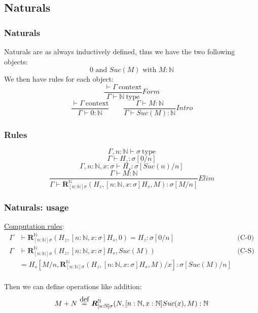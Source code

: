 \documentclass[aspectratio=169]{beamer}
\newcommand{\cntxt}{\ \mathrm{context}}
\newcommand{\typ}{\ \mathrm{type}}
\newcommand{\N}{\mathbb{N}}
\newcommand{\RN}[3]{\mathbold{R}_{[n: \N]\sigma}^{\N}(#1, #2, #3)}
\newcommand{\Intro}{Intro}
\newcommand{\F}{Form}
\newcommand{\E}{Elim}
\newcommand\defeq{\stackrel{\mathclap{\normalfont\mbox{def}}}{\ =\ }}
\newcommand{\bn}{[n:\N,x:\sigma]}
\newcommand{\Gamdash}{\Gamma\vdash}
\begin{document}
    \subsection{Naturals}
    \begin{frame}
        \frametitle{Naturals}
        Naturals are as always inductively defined, thus we have the two following objects:
        $$0 \text{ and } Suc(M) \text{ with } M:\N$$
        \vspace{10pt}
        We then have rules for each object:
        $$\frac{\vdash \Gamma \cntxt}{\Gamma \vdash \N \typ}\F$$
        $$\frac{\vdash \Gamma \cntxt}{\Gamma \vdash 0 : \N}\qquad \frac{\Gamma \vdash M : \N}{\Gamma \vdash Suc(M):\N}\Intro$$
    \end{frame}
    \begin{frame}
        \frametitle{Rules}
        
        $$\Gamma,n:\N\vdash\sigma\typ$$
        $$\Gamdash H_z : \sigma[0/n]$$
        $$\Gamma,n:\N,x:\sigma\vdash H_s : \sigma[Suc(n)/n]$$
        $$\frac{\Gamdash M: \N}{\Gamdash\RN{H_z}{[n:\N,x:\sigma]H_s}{M}:\sigma[M/n]}\E$$
    \end{frame}
    \begin{frame}
        \frametitle{Naturals: usage}
        \underline{Computation rules}:
        \begin{align*}
            \Gamma &\vdash \RN{H_z}{\bn H_s}{0} = H_z: \sigma[0/n] &\text{(C-0)}\\
            \Gamma &\vdash \RN{H_z}{\bn H_s}{Suc(M)} &\text{(C-S)}\\
            &= H_s[M/n,\RN{H_z}{\bn H_s}{M}/x]:\sigma[Suc(M)/n]
        \end{align*}
        \vspace{10pt}\\
        Then we can define operations like addition:
        $$M + N \defeq \RN{N}{[n:\N, x:\N]Suc(x)}{M}:\N$$
    \end{frame}
\end{document}

